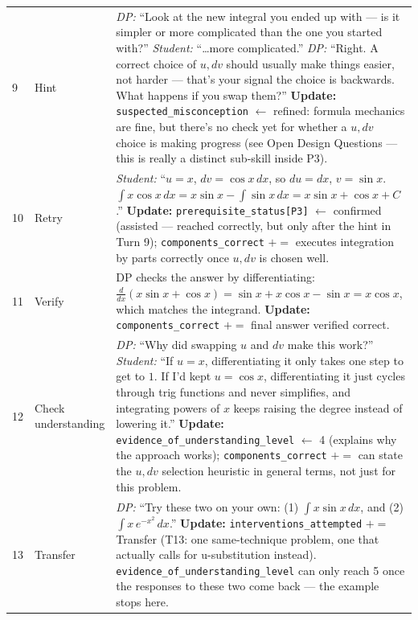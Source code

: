 \documentclass[11pt]{article}
\begin{document}
\begin{longtable}{P{1.0cm} P{2.1cm} P{12.4cm}}
9 & Hint &
  \textit{DP:} ``Look at the new integral you ended up with --- is it
  simpler or more complicated than the one you started with?''
  \newline
  \textit{Student:} ``\ldots more complicated.'' \newline
  \textit{DP:} ``Right. A correct choice of $u,dv$ should usually make
  things easier, not harder --- that's your signal the choice is
  backwards. What happens if you swap them?'' \newline
  \textbf{Update:} \texttt{suspected\_misconception} $\leftarrow$
  refined: formula mechanics are fine, but there's no check yet for
  whether a $u,dv$ choice is making progress (see Open Design
  Questions --- this is really a distinct sub-skill inside P3). \\[2mm]

10 & Retry &
  \textit{Student:} ``$u=x$, $dv=\cos x\,dx$, so $du=dx$, $v=\sin x$.
  $\int x\cos x\,dx = x\sin x - \int\sin x\,dx = x\sin x + \cos x +
  C$.'' \newline
  \textbf{Update:} \texttt{prerequisite\_status[P3]} $\leftarrow$
  confirmed (assisted --- reached correctly, but only after the hint
  in Turn 9); \texttt{components\_correct} $\mathrel{+}=$ executes
  integration by parts correctly once $u,dv$ is chosen well. \\[2mm]

11 & Verify &
  DP checks the answer by differentiating:
  $\frac{d}{dx}(x\sin x+\cos x) = \sin x + x\cos x - \sin x = x\cos
  x$, which matches the integrand. \newline
  \textbf{Update:} \texttt{components\_correct} $\mathrel{+}=$ final
  answer verified correct. \\[2mm]

12 & Check understanding &
  \textit{DP:} ``Why did swapping $u$ and $dv$ make this work?''
  \newline
  \textit{Student:} ``If $u=x$, differentiating it only takes one
  step to get to $1$. If I'd kept $u=\cos x$, differentiating it just
  cycles through trig functions and never simplifies, and integrating
  powers of $x$ keeps raising the degree instead of lowering it.''
  \newline
  \textbf{Update:} \texttt{evidence\_of\_understanding\_level}
  $\leftarrow$ 4 (explains why the approach works);
  \texttt{components\_correct} $\mathrel{+}=$ can state the $u,dv$
  selection heuristic in general terms, not just for this problem. \\[2mm]

13 & Transfer &
  \textit{DP:} ``Try these two on your own: (1) $\int x\sin x\,dx$,
  and (2) $\int x\,e^{-x^2}\,dx$.'' \newline
  \textbf{Update:} \texttt{interventions\_attempted} $\mathrel{+}=$
  Transfer (T13: one same-technique problem, one that actually calls
  for u-substitution instead). \texttt{evidence\_of\_understanding\_level}
  can only reach 5 once the responses to these two come back --- the
  example stops here. \\
\bottomrule
\end{longtable}
\end{document}
